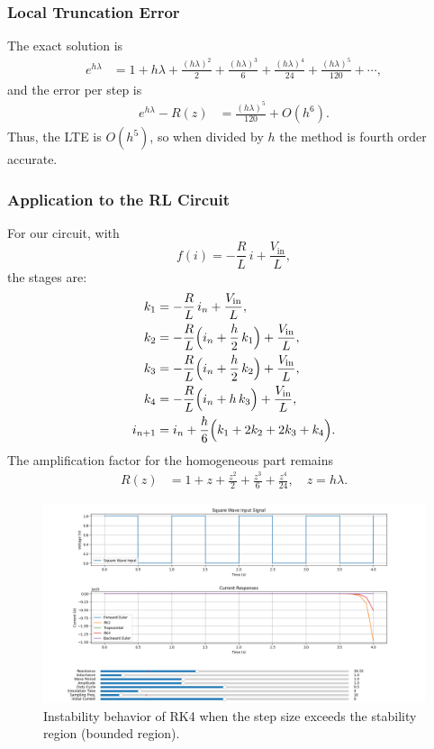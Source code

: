 \documentclass[12pt]{article}
\begin{document}
\subsubsection*{Local Truncation Error}
The exact solution is 
\begin{align}
e^{h\lambda} &= 1+h\lambda+\frac{(h\lambda)^2}{2}+\frac{(h\lambda)^3}{6}+\frac{(h\lambda)^4}{24}+\frac{(h\lambda)^5}{120}+\cdots,
\end{align}
and the error per step is 
\begin{align}
e^{h\lambda} - R(z) &= \frac{(h\lambda)^5}{120}+O(h^6).
\end{align}
Thus, the LTE is $O(h^5)$, so when divided by $h$ the method is fourth order accurate.

\subsubsection*{Application to the RL Circuit}
For our circuit, with 
\[
f(i) = -\frac{R}{L}\, i + \frac{V_{\text{in}}}{L},
\]
the stages are:
\begin{align}
k_1 &= -\frac{R}{L}\, i_n + \frac{V_{\text{in}}}{L}, \\
k_2 &= -\frac{R}{L}\Bigl(i_n+\frac{h}{2}\, k_1\Bigr)+\frac{V_{\text{in}}}{L}, \\
k_3 &= -\frac{R}{L}\Bigl(i_n+\frac{h}{2}\, k_2\Bigr)+\frac{V_{\text{in}}}{L}, \\
k_4 &= -\frac{R}{L}\Bigl(i_n+h\, k_3\Bigr)+\frac{V_{\text{in}}}{L}, \\
i_{n+1} &= i_n+\frac{h}{6}\Bigl(k_1+2k_2+2k_3+k_4\Bigr).
\end{align}
The amplification factor for the homogeneous part remains 
\begin{align}
R(z) &= 1+z+\frac{z^2}{2}+\frac{z^3}{6}+\frac{z^4}{24}, \quad z=h\lambda.
\end{align}

\begin{figure}[htbp]
  \centering
  \includegraphics[width=\textwidth]{figs/instability_rk4.png}
  \caption{Instability behavior of RK4 when the step size exceeds the stability region (bounded region).}
  \label{fig:instability_rk4}
\end{figure}
\end{document}
